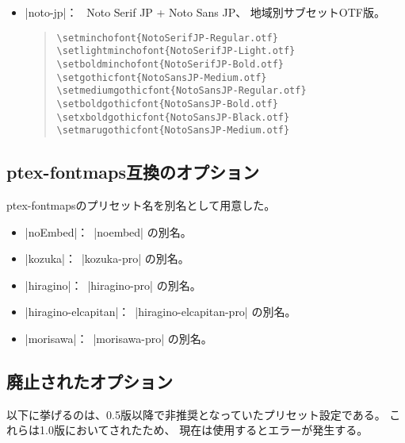 \documentclass[uplatex,dvipdfmx,a4paper]{jsarticle}
\newcommand{\Pkg}[1]{\textsf{#1}}
\newcommand{\Means}{：\ }
\begin{document}
\begin{itemize}
\item |noto-jp|\Means
  Noto Serif JP + Noto Sans JP、
  地域別サブセットOTF版。

\begin{quote}\small\begin{verbatim}
\setminchofont{NotoSerifJP-Regular.otf}
\setlightminchofont{NotoSerifJP-Light.otf}
\setboldminchofont{NotoSerifJP-Bold.otf}
\setgothicfont{NotoSansJP-Medium.otf}
\setmediumgothicfont{NotoSansJP-Regular.otf}
\setboldgothicfont{NotoSansJP-Bold.otf}
\setxboldgothicfont{NotoSansJP-Black.otf}
\setmarugothicfont{NotoSansJP-Medium.otf}
\end{verbatim}\end{quote}

\end{itemize}

\subsection{ptex-fontmaps互換のオプション}

\Pkg{ptex-fontmaps}のプリセット名を別名として用意した。

\begin{itemize}
\item |noEmbed|\Means |noembed| の別名。
\item |kozuka|\Means |kozuka-pro| の別名。
\item |hiragino|\Means |hiragino-pro| の別名。
\item |hiragino-elcapitan|\Means |hiragino-elcapitan-pro| の別名。
\item |morisawa|\Means |morisawa-pro| の別名。
\end{itemize}

\subsection{廃止されたオプション}

以下に挙げるのは、0.5版以降で非推奨となっていたプリセット設定である。
これらは1.0版においてされたため、
現在は使用するとエラーが発生する。
\end{document}
